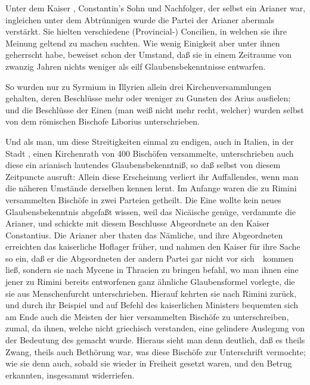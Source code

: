 \begin{aufza}
\item Unter dem Kaiser , Constantin's Sohn und Nachfolger, der selbst ein Arianer war, ingleichen unter  dem Abtrünnigen wurde die Partei der Arianer abermals verstärkt. Sie hielten verschiedene (Provincial-) Concilien, in welchen sie ihre Meinung geltend zu machen suchten. Wie wenig Einigkeit aber unter ihnen geherrscht habe, beweiset schon der Umstand, daß sie in einem Zeitraume von zwanzig Jahren nichts weniger als eilf Glaubensbekenntnisse entwarfen.
\item So wurden nur zu Syrmium in Illyrien allein drei Kirchenversammlungen gehalten, deren Beschlüsse mehr oder weniger zu Gunsten des Arius ausfielen; und die Beschlüsse der Einen (man weiß nicht mehr recht, welcher) wurden selbst von dem römischen Bischofe Liborius unterschrieben.
\item Und als man, um diese Streitigkeiten einmal zu endigen, auch in Italien, in der Stadt , einen Kirchenrath von 400 Bischöfen versammelte, unterschrieben auch diese ein arianisch lautendes Glaubensbekenntniß, so daß selbst  von diesem Zeitpuncte ausruft:  Allein diese Erscheinung verliert ihr Auffallendes, wenn man die näheren Umstände derselben kennen lernt. Im Anfange waren die zu Rimini versammelten Bischöfe in zwei Parteien getheilt. Die Eine wollte kein neues Glaubensbekenntnis abgefaßt wissen, weil das Nicäische genüge, verdammte die Arianer, und schickte mit diesem Beschlusse Abgeordnete an den Kaiser Constantius. Die Arianer aber thaten das Nämliche, und ihre Abgeordneten erreichten das kaiserliche Hoflager früher, und nahmen den Kaiser für ihre Sache so ein, daß er die Abgeordneten der andern Partei gar nicht vor sich~\ kommen ließ, sondern sie nach Mycene in Thracien zu bringen befahl, wo man ihnen eine jener zu Rimini bereits entworfenen ganz ähnliche Glaubensformel vorlegte, die sie aus Menschenfurcht unterschrieben. Hierauf kehrten sie nach Rimini zurück, und durch ihr Beispiel und auf Befehl des kaiserlichen Ministers bequemten sich am Ende auch die Meisten der hier versammelten Bischöfe zu unterschreiben, zumal, da ihnen, welche nicht griechisch verstanden, eine gelindere Auslegung von der Bedeutung des  gemacht wurde. Hieraus sieht man denn deutlich, daß es theils Zwang, theils auch Bethörung war, was diese Bischöfe zur Unterschrift vermochte; wie sie denn auch, sobald sie wieder in Freiheit gesetzt waren, und den Betrug erkannten, insgesammt widerriefen.

\end{aufza}
